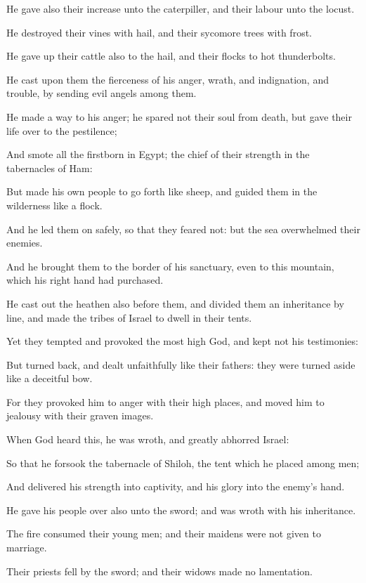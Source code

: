 \verse He gave also their increase unto the caterpiller, and their labour unto the locust.

\verse He destroyed their vines with hail, and their sycomore trees with frost.

\verse He gave up their cattle also to the hail, and their flocks to hot thunderbolts.

\verse He cast upon them the fierceness of his anger, wrath, and indignation, and trouble, by sending evil angels among them.

\verse He made a way to his anger; he spared not their soul from death, but gave their life over to the pestilence;

\verse And smote all the firstborn in Egypt; the chief of their strength in the tabernacles of Ham:

\verse But made his own people to go forth like sheep, and guided them in the wilderness like a flock.

\verse And he led them on safely, so that they feared not: but the sea overwhelmed their enemies.

\verse And he brought them to the border of his sanctuary, even to this mountain, which his right hand had purchased.

\verse He cast out the heathen also before them, and divided them an inheritance by line, and made the tribes of Israel to dwell in their tents.

\verse Yet they tempted and provoked the most high God, and kept not his testimonies:

\verse But turned back, and dealt unfaithfully like their fathers: they were turned aside like a deceitful bow.

\verse For they provoked him to anger with their high places, and moved him to jealousy with their graven images.

\verse When God heard this, he was wroth, and greatly abhorred Israel:

\verse So that he forsook the tabernacle of Shiloh, the tent which he placed among men;

\verse And delivered his strength into captivity, and his glory into the enemy's hand.

\verse He gave his people over also unto the sword; and was wroth with his inheritance.

\verse The fire consumed their young men; and their maidens were not given to marriage.

\verse Their priests fell by the sword; and their widows made no lamentation.

